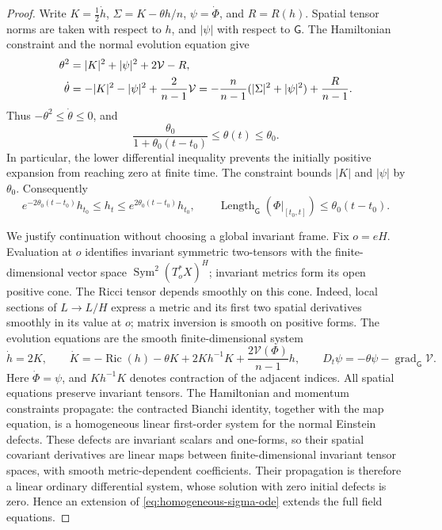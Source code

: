 \documentclass[10pt,a4paper]{article}
\numberwithin{equation}{section}
\theoremstyle{definition}
\theoremstyle{remark}
\newcommand{\Ric}{\operatorname{Ric}}
\begin{document}
\begin{proof}
Write $K=\tfrac12\dot h$, $\Sigma=K-\theta h/n$,
$\psi=\dot\Phi$, and $R=R(h)$.  Spatial tensor norms are taken with
respect to $h$, and $|\psi|$ with respect to $\mathsf G$.
The Hamiltonian constraint and the normal evolution equation give
\begin{align}
 \theta^2&=|K|^2+|\psi|^2+2\mathcal V-R,\notag\\
 \dot\theta&=-|K|^2-|\psi|^2+\frac{2}{n-1}\mathcal V
 =-\frac n{n-1}(|\Sigma|^2+|\psi|^2)+\frac R{n-1}.
 \label{eq:higher-future-identities}
\end{align}
Thus $-\theta^2\le\dot\theta\le0$, and
\begin{equation}
 \frac{\theta_0}{1+\theta_0(t-t_0)}\le\theta(t)\le\theta_0.
 \label{eq:future-expansion-bounds}
\end{equation}
In particular, the lower differential inequality prevents the initially
positive expansion from reaching zero at finite time.
The constraint bounds $|K|$ and $|\psi|$ by $\theta_0$.
Consequently
\begin{equation}
 e^{-2\theta_0(t-t_0)}h_{t_0}\le h_t
 \le e^{2\theta_0(t-t_0)}h_{t_0},\qquad
 \operatorname{Length}_{\mathsf G}
       (\Phi|_{[t_0,t]})\le\theta_0(t-t_0).
 \label{eq:homogeneous-sigma-finite-slab}
\end{equation}

We justify continuation without choosing a global invariant frame.
Fix $o=eH$.  Evaluation at $o$ identifies invariant symmetric
two-tensors with the finite-dimensional vector space
$\operatorname{Sym}^2(T_o^*X)^H$; invariant metrics form its open
positive cone.  The Ricci tensor depends smoothly on this cone.
Indeed, local sections of $L\to L/H$ express a metric and its first
two spatial derivatives smoothly in its value at $o$; matrix
inversion is smooth on positive forms.  The evolution equations are
the smooth finite-dimensional system
\begin{equation}
 \dot h=2K,\qquad
 \dot K=-\Ric(h)-\theta K+2Kh^{-1}K+
                 \frac{2\mathcal V(\Phi)}{n-1}h,
 \qquad D_t\psi=-\theta\psi-
                       \operatorname{grad}_{\mathsf G}\mathcal V.
 \label{eq:homogeneous-sigma-ode}
\end{equation}
Here $\dot\Phi=\psi$, and $Kh^{-1}K$ denotes contraction of the
adjacent indices.  All spatial equations preserve invariant tensors.
The Hamiltonian and momentum constraints propagate: the contracted
Bianchi identity, together with the map equation, is a homogeneous
linear first-order system for the normal Einstein defects.  These
defects are invariant scalars and one-forms, so their spatial
covariant derivatives are linear maps between finite-dimensional
invariant tensor spaces, with smooth metric-dependent coefficients.
Their propagation is therefore a linear
ordinary differential system, whose solution with zero initial
defects is zero.  Hence an extension of
\eqref{eq:homogeneous-sigma-ode} extends the full field equations.


\end{proof}
\end{document}
